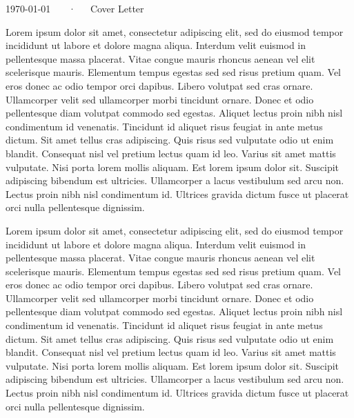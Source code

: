 \documentclass[11pt, a4paper]{awesome-cv}
\begin{document}
\makecvheader

\makecvfooter
{\today}
{\myName~~~·~~~Cover Letter}
{}

\makelettertitle

\begin{cvletter}

    Lorem ipsum dolor sit amet, consectetur adipiscing elit, sed do eiusmod tempor incididunt
    ut labore et dolore magna aliqua. Interdum velit euismod in pellentesque massa placerat.
    Vitae congue mauris rhoncus aenean vel elit scelerisque mauris. Elementum tempus egestas
    sed sed risus pretium quam. Vel eros donec ac odio tempor orci dapibus. Libero volutpat
    sed cras ornare. Ullamcorper velit sed ullamcorper morbi tincidunt ornare. Donec et odio
    pellentesque diam volutpat commodo sed egestas. Aliquet lectus proin nibh nisl condimentum
    id venenatis. Tincidunt id aliquet risus feugiat in ante metus dictum. Sit amet tellus cras
    adipiscing. Quis risus sed vulputate odio ut enim blandit. Consequat nisl vel pretium lectus
    quam id leo. Varius sit amet mattis vulputate. Nisi porta lorem mollis aliquam. Est lorem
    ipsum dolor sit. Suscipit adipiscing bibendum est ultricies. Ullamcorper a lacus vestibulum
    sed arcu non. Lectus proin nibh nisl condimentum id. Ultrices gravida dictum fusce ut placerat
    orci nulla pellentesque dignissim.

    Lorem ipsum dolor sit amet, consectetur adipiscing elit, sed do eiusmod tempor incididunt
    ut labore et dolore magna aliqua. Interdum velit euismod in pellentesque massa placerat.
    Vitae congue mauris rhoncus aenean vel elit scelerisque mauris. Elementum tempus egestas
    sed sed risus pretium quam. Vel eros donec ac odio tempor orci dapibus. Libero volutpat
    sed cras ornare. Ullamcorper velit sed ullamcorper morbi tincidunt ornare. Donec et odio
    pellentesque diam volutpat commodo sed egestas. Aliquet lectus proin nibh nisl condimentum
    id venenatis. Tincidunt id aliquet risus feugiat in ante metus dictum. Sit amet tellus cras
    adipiscing. Quis risus sed vulputate odio ut enim blandit. Consequat nisl vel pretium lectus
    quam id leo. Varius sit amet mattis vulputate. Nisi porta lorem mollis aliquam. Est lorem
    ipsum dolor sit. Suscipit adipiscing bibendum est ultricies. Ullamcorper a lacus vestibulum
    sed arcu non. Lectus proin nibh nisl condimentum id. Ultrices gravida dictum fusce ut placerat
    orci nulla pellentesque dignissim.


\end{cvletter}
\end{document}
